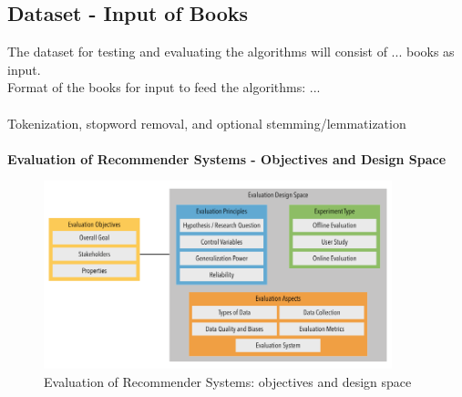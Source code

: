 \documentclass[\myFontSize,oneside,english,hidelinks,a4paper]{article}
\begin{document}
\subsection{Dataset - Input of Books}
The dataset for testing and evaluating the algorithms will consist of ... books as input.\\
Format of the books for input to feed the algorithms: ...\\\\
Tokenization, stopword removal, and optional stemming/lemmatization\\\\
%
%
\newpage{}
\textbf{Evaluation of Recommender Systems - Objectives and Design Space}
\begin{figure}[h!]
    \centering
    \includegraphics[width=0.9\textwidth]{img/evaluation_figure.png}
    \caption{Evaluation of Recommender Systems: objectives and design space \cite{Zangerle2023}}
    \label{fig:evaluation}
\end{figure}
%





\clearpage
\thispagestyle{empty}
\mbox{}



\end{document}
